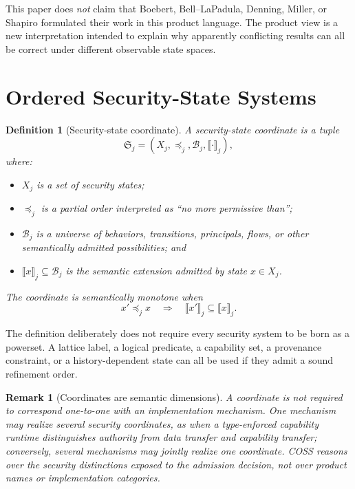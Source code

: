 \documentclass[10pt,twocolumn]{article}
\newcommand{\Model}{\textnormal{\textsc{COSS}}\xspace}
\newcommand{\sem}[1]{\llbracket #1 \rrbracket}
\newtheorem{definition}{Definition}
\newtheorem{remark}{Remark}
\begin{document}
This paper does \emph{not} claim that Boebert, Bell--LaPadula, Denning, Miller,
or Shapiro formulated their work in this product language.  The product view is
a new interpretation intended to explain why apparently conflicting results
can all be correct under different observable state spaces.


\section{Ordered Security-State Systems}

\begin{definition}[Security-state coordinate]\label{def:coordinate}
A security-state coordinate is a tuple
\begin{equation}
  \mathfrak{S}_j=(X_j,\preceq_j,\mathcal{B}_j,\sem{\cdot}_j),
\end{equation}
where:
\begin{itemize}[leftmargin=*]
  \item $X_j$ is a set of security states;
  \item $\preceq_j$ is a partial order interpreted as ``no more permissive
        than'';
  \item $\mathcal{B}_j$ is a universe of behaviors, transitions, principals,
        flows, or other semantically admitted possibilities; and
  \item $\sem{x}_j\subseteq\mathcal{B}_j$ is the semantic extension admitted
        by state $x\in X_j$.
\end{itemize}
The coordinate is \emph{semantically monotone} when
\begin{equation}
  x'\preceq_j x
  \quad\Longrightarrow\quad
  \sem{x'}_j\subseteq\sem{x}_j.
  \label{eq:semantic-monotonicity}
\end{equation}
\end{definition}

The definition deliberately does not require every security system to be born
as a powerset.  A lattice label, a logical predicate, a capability set, a
provenance constraint, or a history-dependent state can all be used if they
admit a sound refinement order.

\begin{remark}[Coordinates are semantic dimensions]
A coordinate is not required to correspond one-to-one with an implementation
mechanism.  One mechanism may realize several security coordinates, as when a
type-enforced capability runtime distinguishes authority from data transfer and
capability transfer; conversely, several mechanisms may jointly realize one
coordinate.  \Model reasons over the security distinctions exposed to the
admission decision, not over product names or implementation categories.
\end{remark}
\end{document}
